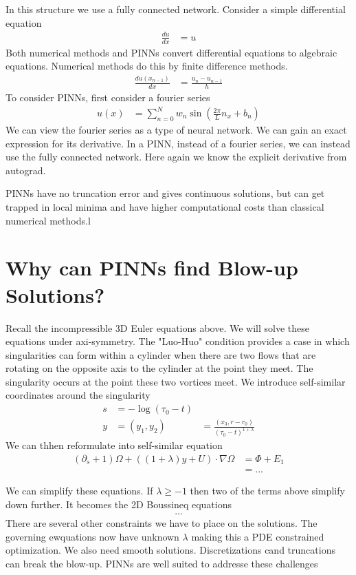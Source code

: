 \documentclass[book.tex]{subfiles}
\begin{document}
In this structure we use a fully connected network. Consider a simple differential equation
\begin{align}
\frac{du}{dx} &= u
\end{align}
Both numerical methods and PINNs convert differential equations to algebraic equations. Numerical methods do this by finite difference methods.
\begin{align}
\frac{du(x_{n-1})}{dx} &= \frac{u_n - u_{n-1}}{h}
\end{align}
To consider PINNs, first consider a fourier series
\begin{align}
u(x) &= \sum_{n=0}^N w_n \sin(\frac{2\pi}{L} n_x + b_n)
\end{align}
We can view the fourier series as a type of neural network. We can gain an exact expression for its derivative. In a PINN, instead of a fourier series, we can instead use the fully connected network. Here again we know the explicit derivative from autograd. 

PINNs have no truncation error and gives continuous solutions, but can get trapped in local minima and have higher computational costs than classical numerical methods.l

\section{Why can PINNs find Blow-up Solutions?}

Recall the incompressible 3D Euler equations above. We will solve these equations under axi-symmetry. The "Luo-Huo" condition provides a case in which singularities can form within a cylinder when there are two flows that are rotating on the opposite axis to the cylinder at the point they meet. The singularity occurs at the point these two vortices meet. We introduce self-similar coordinates around the singularity
\begin{align}
s &= - \log (\tau_0 - t) \\
y &= (y_1, y_2) &= \frac{(x_3, r-r_0)}{(\tau_0 - t)^{1+\lambda}}
\end{align}
We can thhen reformulate into self-similar equation
\begin{align}
(\partial_s + 1) \Omega + ((1 + \lambda) y + U) \cdot \nabla \Omega &= \Phi + E_1 \\
&= ...
\end{align}

We can simplify these equations. If $\lambda \geq -1$ then two of the terms above simplify down further. It becomes the 2D Boussineq equations
\begin{align}
...
\end{align}
There are several other constraints we have to place on the solutions. The governing ewquations now have unknown $\lambda$ making this a PDE constrained optimization. We also need smooth solutions. Discretizations cand truncations can break the blow-up. PINNs are well suited to addresse these challenges
\end{document}
